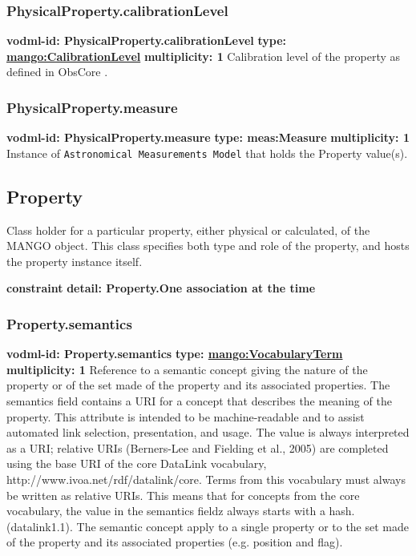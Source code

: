    \subsubsection{PhysicalProperty.calibrationLevel}
      \textbf{vodml-id: PhysicalProperty.calibrationLevel} \newline
      \textbf{type: \hyperref[sect:CalibrationLevel]{mango:CalibrationLevel}} \newline
      \textbf{multiplicity: 1} \newline
      Calibration level of the property as defined in ObsCore \citep{2011ivoa.spec.1028T}.

    \subsubsection{PhysicalProperty.measure}
      \textbf{vodml-id: PhysicalProperty.measure} \newline
      \textbf{type: meas:Measure} \newline
      \textbf{multiplicity: 1} \newline
      Instance of \texttt{Astronomical Measurements Model} that holds the Property value(s).

  \subsection{Property}
  \label{sect:Property}
    Class holder for a particular property, either physical or calculated, of the MANGO object. This class specifies both type and role of the property, and hosts the property instance itself.

    \noindent \textbf{constraint} \newline
    \indent    \textbf{detail: Property.One association at the time
 }\newline


    \subsubsection{Property.semantics}
      \textbf{vodml-id: Property.semantics} \newline
      \textbf{type: \hyperref[sect:VocabularyTerm]{mango:VocabularyTerm}} \newline
      \textbf{multiplicity: 1} \newline
      Reference to a semantic concept giving the nature of the property or of the set made of the property and its associated properties. The semantics field contains a URI for a concept that describes the meaning of the property. This attribute is intended to be machine-readable and to assist automated link selection, presentation, and usage. The value is always interpreted as a URI; relative URIs (Berners-Lee and Fielding et al., 2005) are completed using the base URI of the core DataLink vocabulary, http://www.ivoa.net/rdf/datalink/core. Terms from this vocabulary must always be written as relative URIs. This means that for concepts from the core vocabulary, the value in the semantics fieldz always starts with a hash. (datalink1.1). The semantic concept apply to a single property or to the set made of the property and its associated properties (e.g. position and flag).

